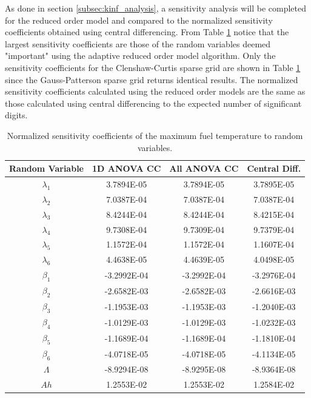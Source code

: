 As done in section \ref{subsec:kinf_analysis}, a sensitivity analysis will be completed for the reduced order model and compared to the normalized sensitivity coefficients obtained using central differencing. From Table \ref{table:pk_sensitivities} notice that the largest sensitivity coefficients are those of the random variables deemed "important" using the adaptive reduced order model algorithm. Only the sensitivity coefficients for the Clenshaw-Curtis sparse grid are shown in Table \ref{table:pk_sensitivities} since the Gauss-Patterson sparse grid returns identical results. The normalized sensitivity coefficients calculated using the reduced order models are the same as those calculated using central differencing to the expected number of significant digits.   
\begin{table}[!htb] 
\caption{\label{table:pk_sensitivities} 
Normalized sensitivity coefficients of the maximum fuel temperature to random variables.}
\centering
\begin{tabular}{||c|c|c|c||} 
\hline \hline
\textbf{Random Variable} & \textbf{1D ANOVA CC} & \textbf{All ANOVA CC} & \textbf{Central Diff.} \\ \hline
$\lambda_1$  &  3.7894E-05 &  3.7894E-05 &  3.7895E-05 \\ \hline
$\lambda_2$  &  7.0387E-04 &  7.0387E-04 &  7.0387E-04 \\ \hline
$\lambda_3$  &  8.4244E-04 &  8.4244E-04 &  8.4215E-04 \\ \hline
$\lambda_4$  &  9.7308E-04 &  9.7309E-04 &  9.7379E-04 \\ \hline
$\lambda_5$  &  1.1572E-04 &  1.1572E-04 &  1.1607E-04 \\ \hline
$\lambda_6$  &  4.4638E-05 &  4.4639E-05 &  4.0498E-05 \\ \hline
$\beta_1$    & -3.2992E-04 & -3.2992E-04 & -3.2976E-04 \\ \hline
$\beta_2$    & -2.6582E-03 & -2.6582E-03 & -2.6616E-03 \\ \hline
$\beta_3$    & -1.1953E-03 & -1.1953E-03 & -1.2040E-03 \\ \hline
$\beta_4$    & -1.0129E-03 & -1.0129E-03 & -1.0232E-03 \\ \hline
$\beta_5$    & -1.1689E-04 & -1.1689E-04 & -1.1810E-04 \\ \hline
$\beta_6$    & -4.0718E-05 & -4.0718E-05 & -4.1134E-05 \\ \hline
$\Lambda$    & -8.9294E-08 & -8.9295E-08 & -8.9364E-08 \\ \hline
$Ah$         &  1.2553E-02 &  1.2553E-02 &  1.2584E-02 \\ \hline

\end{tabular}
\end{table}
